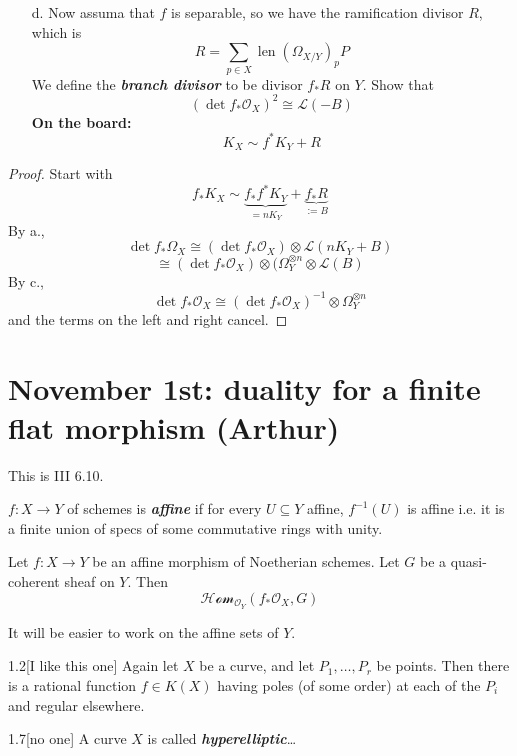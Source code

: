 \begin{enumerate}
	\item[d.] Now assuma that $f$ is separable, so we have the ramification divisor $R$, which is
\[R=\sum_{p\in X}\operatorname{len}\left( \Omega_{X/Y} \right)_pP\]
		We define the \textit{\textbf{branch divisor}} to be divisor $f_* R$ on $ Y$. Show that
		\[(\det f_* \mathcal{O}_X)^2\cong \mathcal{L}(-B)\]
		\textbf{On the board:}
		\[K_X\sim f^*K_Y+R\]
\end{enumerate}

\begin{proof}\leavevmode
	Start with
	\[f_* K_X\sim  \underbrace{f_* f^* K_Y}_{=nK_Y} +\underbrace{f_* R}_{:=B}\]
	By a.,
	\[\det f_*\Omega_X\cong (\det f_*\mathcal{O}_X)\otimes \mathcal{L}(nK_Y+B)\]
	\[\cong (\det f_*\mathcal{O}_X)\otimes(\Omega_Y^{\otimes n}\otimes \mathcal{L}(B)\]
By c.,	\[\det f_*\mathcal{O}_X\cong (\det f_*\mathcal{O}_X)^{-1}\otimes \Omega_Y^{\otimes n}\]
and the terms on the left and right cancel.

\end{proof}

\section{November 1st: duality for a finite flat morphism (Arthur)}

This is III 6.10.

\begin{defn}\leavevmode
	$f:X\to Y$ of schemes is \textit{\textbf{affine}} if for every  $U\subseteq Y$ affine, $f^{-1}(U)$ is affine i.e. it is a finite union of specs of some commutative rings with unity.
\end{defn}

Let $f:X\to Y$ be an affine morphism of Noetherian schemes. Let $G$ be a quasi-coherent sheaf on  $Y$. Then
 \[\mathcal{Hom}_{\mathcal{O}_Y}(f_*\mathcal{O}_X,G)\]

 It will be easier to work on the affine sets of $Y$.


\begin{manualexercise}{1.2}[I like this one]
	Again let $X$ be a curve, and let $P_1,\ldots,P_r$ be points. Then there is a rational  function $f\in K(X)$ having poles (of some order) at each of the $P_i$ and regular  elsewhere.  
\end{manualexercise}

\begin{manualexercise}{1.7}[no one]
	A curve $X$ is called \textit{\textbf{hyperelliptic}}…
\end{manualexercise}

